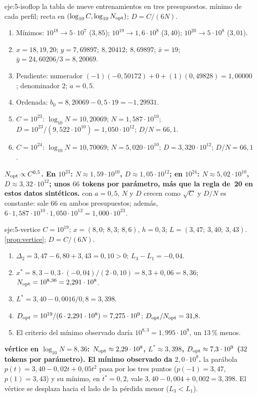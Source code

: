 \begin{solucion}{eje:5-isoflop}
\datos la tabla de nueve entrenamientos en tres presupuestos.
\planteamiento mínimo de cada perfil; recta en $(\log_{10}C,\log_{10}N_{\mathrm{opt}})$; $D=C/(6N)$.
\pasos
\begin{enumerate}[label=\arabic*.]
  \item Mínimos: $10^{18}\to 5\cdot 10^{7}$ ($3{,}85$); $10^{19}\to 1{,}6\cdot 10^{8}$ ($3{,}40$); $10^{20}\to 5\cdot 10^{8}$ ($3{,}01$).
  \item $x=18,19,20$; $y=7{,}69897;\ 8{,}20412;\ 8{,}69897$; $\bar x=19$; $\bar y=24{,}60206/3=8{,}20069$.
  \item Pendiente: numerador $(-1)(-0{,}50172)+0+(1)(0{,}49828)=1{,}00000$; denominador $2$; $a=0{,}5$.
  \item Ordenada: $b_0=8{,}20069-0{,}5\cdot 19=-1{,}29931$.
  \item $C=10^{23}$: $\log_{10}N=10{,}20069$; $N=1{,}587\cdot 10^{10}$; $D=10^{23}/(9{,}522\cdot 10^{10})=1{,}050\cdot 10^{12}$; $D/N=66{,}1$.
  \item $C=10^{24}$: $\log_{10}N=10{,}70069$; $N=5{,}020\cdot 10^{10}$; $D=3{,}320\cdot 10^{12}$; $D/N=66{,}1$.
\end{enumerate}
\resultado \textbf{$N_{\mathrm{opt}}\propto C^{0{,}5}$. En $10^{23}$: $N\approx 1{,}59\cdot 10^{10}$, $D\approx 1{,}05\cdot 10^{12}$; en $10^{24}$: $N\approx 5{,}02\cdot 10^{10}$, $D\approx 3{,}32\cdot 10^{12}$; unos $66$ tokens por parámetro, más que la regla de~20 en estos datos sintéticos.}
\comprobacion con $a=0{,}5$, $N$ y $D$ crecen como $\sqrt C$ y $D/N$ es constante: sale $66$ en ambos presupuestos; además, $6\cdot 1{,}587\cdot 10^{10}\cdot 1{,}050\cdot 10^{12}=1{,}000\cdot 10^{23}$.
\end{solucion}

\begin{solucion}{eje:5-vertice}
\datos $C=10^{19}$; $x=(8{,}0;\ 8{,}3;\ 8{,}6)$, $h=0{,}3$; $L=(3{,}47;\ 3{,}40;\ 3{,}43)$.
\planteamiento \cref{prop:vertice}; $D=C/(6N)$.
\pasos
\begin{enumerate}[label=\arabic*.]
  \item $\Delta_2=3{,}47-6{,}80+3{,}43=0{,}10>0$; $L_3-L_1=-0{,}04$.
  \item $x^{*}=8{,}3-0{,}3\cdot(-0{,}04)/(2\cdot 0{,}10)=8{,}3+0{,}06=8{,}36$; $N_{\mathrm{opt}}=10^{8{,}36}=2{,}291\cdot 10^{8}$.
  \item $L^{*}=3{,}40-0{,}0016/0{,}8=3{,}398$.
  \item $D_{\mathrm{opt}}=10^{19}/(6\cdot 2{,}291\cdot 10^{8})=7{,}275\cdot 10^{9}$; $D_{\mathrm{opt}}/N_{\mathrm{opt}}=31{,}8$.
  \item El criterio del mínimo observado daría $10^{8{,}3}=1{,}995\cdot 10^{8}$, un $13\,\%$ menos.
\end{enumerate}
\resultado \textbf{vértice en $\log_{10}N=8{,}36$: $N_{\mathrm{opt}}\approx 2{,}29\cdot 10^{8}$, $L^{*}\approx 3{,}398$, $D_{\mathrm{opt}}\approx 7{,}3\cdot 10^{9}$ ($32$ tokens por parámetro). El mínimo observado da $2{,}0\cdot 10^{8}$.}
\comprobacion la parábola $p(t)=3{,}40-0{,}02t+0{,}05t^{2}$ pasa por los tres puntos ($p(-1)=3{,}47$, $p(1)=3{,}43$) y su mínimo, en $t^{*}=0{,}2$, vale $3{,}40-0{,}004+0{,}002=3{,}398$. El vértice se desplaza hacia el lado de la pérdida menor ($L_3<L_1$).
\end{solucion}

